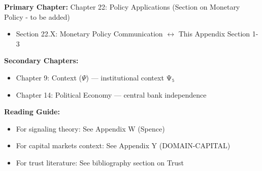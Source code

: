 %
%

%
%
%
%

\begin{tcolorbox}[colback=purple!5!white, colframe=purple!75!black,
    title=Chapter Linkage]

\textbf{Primary Chapter:} Chapter 22: Policy Applications (Section on Monetary Policy - to be added)
\begin{itemize}[nosep]
\item Section 22.X: Monetary Policy Communication $\leftrightarrow$ This Appendix Section 1-3
\end{itemize}

\textbf{Secondary Chapters:}
\begin{itemize}[nosep]
\item Chapter 9: Context ($\Psi$) --- institutional context Ψ₅
\item Chapter 14: Political Economy --- central bank independence
\end{itemize}

\textbf{Reading Guide:}
\begin{itemize}[nosep]
\item For signaling theory: See Appendix W (Spence)
\item For capital markets context: See Appendix Y (DOMAIN-CAPITAL)
\item For trust literature: See bibliography section on Trust
\end{itemize}

\end{tcolorbox}


